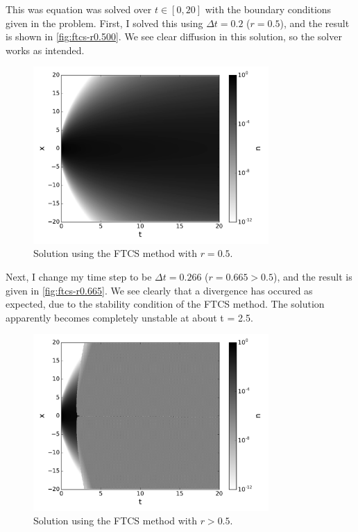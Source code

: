 \documentclass[12pt]{article}
\begin{document}
This was equation was solved over $t \in [0, 20]$ with the boundary conditions
given in the problem. First, I solved this using $\Delta t = 0.2$ ($r = 0.5$),
and the result is shown in \autoref{fig:ftcs-r0.500}. We see clear diffusion in
this solution, so the solver works as intended.

\begin{figure}[ht]
    \centering
    \includegraphics[width=0.8\textwidth]{ftcs-r0.500}
    \caption{Solution using the FTCS method with $r = 0.5$.}
    \label{fig:ftcs-r0.500}
\end{figure}

Next, I change my time step to be $\Delta t = 0.266$ ($r = 0.665 > 0.5$), and
the result is given in \autoref{fig:ftcs-r0.665}. We see clearly that a
divergence has occured as expected, due to the stability condition of the FTCS
method. The solution apparently becomes completely unstable at about t = 2.5.

\begin{figure}[ht]
    \centering
    \includegraphics[width=0.8\textwidth]{ftcs-r0.665}
    \caption{Solution using the FTCS method with $r > 0.5$.}
    \label{fig:ftcs-r0.665}
\end{figure}
\end{document}
